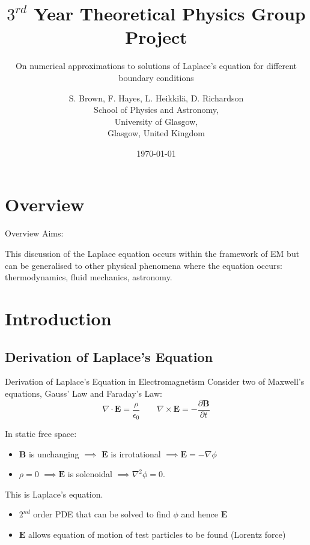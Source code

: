 \documentclass{beamer}
\title{$3^{rd}$ Year Theoretical Physics Group Project}
\subtitle{On numerical approximations to solutions of Laplace's equation for different boundary conditions}
\author{S. Brown, F. Hayes, L. Heikkil{\"a}, D. Richardson\\
        School of Physics and Astronomy,\\
        University of Glasgow,\\
        Glasgow, United Kingdom}
\date{\today}
\newcommand{\be}{\begin{equation}}
\newcommand{\ee}{\end{equation}}
\begin{document}

\begin{frame} 
\titlepage
\end{frame}

\begin{frame}
\tableofcontents
\end{frame}

\section{Overview}
\begin{frame}{Overview}
Aims:

This discussion of the Laplace equation occurs within the framework of EM but can
be generalised to other physical phenomena where the equation occurs:
thermodynamics, fluid mechanics, astronomy.
\end{frame}

\section{Introduction}
\subsection{Derivation of Laplace's Equation}

\begin{frame}{Derivation of Laplace's Equation in Electromagnetism}
Consider two of Maxwell's equations, Gauss' Law and Faraday's Law:
%
\be
\nabla \cdot \bm{E} = \frac{\rho}{\epsilon_0} \qquad \nabla \times \bm{E} = -\frac{\partial \bm{B}}{\partial t}
\ee

In static free space:
\begin{itemize}
 \item $\bm{B}$ is unchanging $\implies$ $\bm{E}$ is irrotational $\implies \bm{E} = -\nabla \phi$
 \item $\rho=0$ $\implies \bm{E}$ is solenoidal $\implies \nabla^2 \phi = 0$.
\end{itemize}

This is Laplace's equation.
\begin{itemize}
 \item $2^{nd}$ order PDE that can be solved to find $\phi$ and hence $\bm{E}$
 \item $\bm{E}$ allows equation of motion of test particles to be found (Lorentz force)
\end{itemize}
\end{frame}
\end{document}
